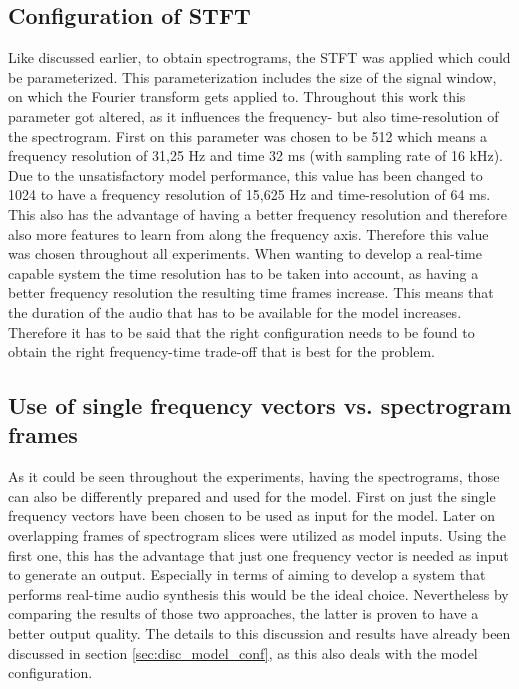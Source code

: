 \subsection{Configuration of STFT}
Like discussed earlier, to obtain spectrograms, the STFT was applied which could be parameterized. This parameterization includes the size of the signal window, on which the Fourier transform gets applied to. Throughout this work this parameter got altered, as it influences the frequency- but also time-resolution of the spectrogram. First on this parameter was chosen to be 512 which means a frequency resolution of 31,25 Hz and time 32 ms (with sampling rate of 16 kHz). Due to the unsatisfactory model performance, this value has been changed to 1024 to have a frequency resolution of 15,625 Hz and time-resolution of 64 ms. This also has the advantage of having a better frequency resolution and therefore also more features to learn from along the frequency axis. Therefore this value was chosen throughout all experiments. When wanting to develop a real-time capable system the time resolution has to be taken into account, as having a better frequency resolution the resulting time frames increase. This means that the duration of the audio that has to be available for the model increases. Therefore it has to be said that the right configuration needs to be found to obtain the right frequency-time trade-off that is best for the problem.

\subsection{Use of single frequency vectors vs. spectrogram frames}
As it could be seen throughout the experiments, having the spectrograms, those can also be differently prepared and used for the model. First on just the single frequency vectors have been chosen to be used as input for the model. Later on overlapping frames of spectrogram slices were utilized as model inputs. Using the first one, this has the advantage that just one frequency vector is needed as input to generate an output. Especially in terms of aiming to develop a system that performs real-time audio synthesis this would be the ideal choice. Nevertheless by comparing the results of those two approaches, the latter is proven to have a better output quality. The details to this discussion and results have already been discussed in section \ref{sec:disc_model_conf}, as this also deals with the model configuration. 

